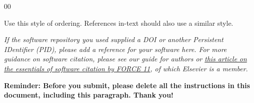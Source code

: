 \documentclass[preprint,12pt, a4paper]{elsarticle}
\begin{document}
\begin{thebibliography}{00}


\bibitem{} Use this style of ordering. References in-text should also use a similar style.

\end{thebibliography}

\textit{If the software repository you used supplied a DOI or another
Persistent IDentifier (PID), please add a reference for your software
here. For more guidance on software citation, please see our guide for
authors or \href{https://f1000research.com/articles/9-1257/v2}{this
  article on the essentials of software citation by FORCE 11}, of
which Elsevier is a member.}

\large{\textbf{Reminder: Before you submit, please delete all 
the instructions in this document, 
including this paragraph. 
Thank you!}}
\end{document}
